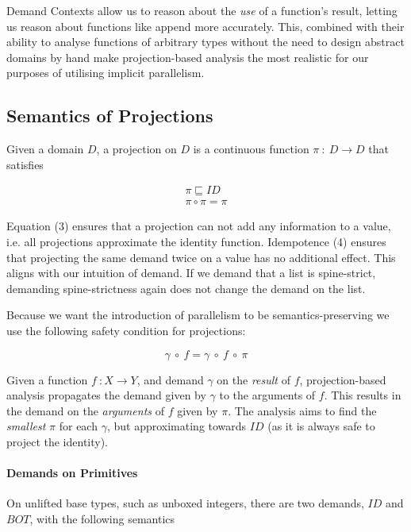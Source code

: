 Demand Contexts allow us to reason about the \emph{use} of a function's result,
letting us reason about functions like \<append\> more accurately. This, combined
with their ability to analyse functions of arbitrary types without the need to
design abstract domains by hand make projection-based analysis the most
realistic for our purposes of utilising implicit parallelism.

\pagebreak

\subsection{Semantics of Projections}
\label{sec:projSem}

Given a domain $D$, a projection on $D$ is a continuous function
$\pi \ : \ D \rightarrow D$ that satisfies

\begin{align}
\pi \sqsubseteq ID \\
\pi \circ \pi = \pi
\end{align}

Equation (3) ensures that a projection can not add any information to a value,
i.e. all projections approximate the identity function. Idempotence (4) ensures
that projecting the same demand twice on a value has no additional effect. This
aligns with our intuition of demand. If we demand that a list is spine-strict,
demanding spine-strictness again does not change the demand on the list.

Because we want the introduction of parallelism to be semantics-preserving we
use the following safety condition for projections:

\begin{equation}
\gamma \ \circ \ f = \gamma \ \circ \ f \ \circ \ \pi
\end{equation}

Given a function $f \ : X \rightarrow Y$, and demand $\gamma$ on the
\emph{result} of $f$, projection-based analysis propagates the demand given by
$\gamma$ to the arguments of $f$. This results in the demand on the
\emph{arguments} of $f$ given by $\pi$.  The analysis aims to find the
\emph{smallest} $\pi$ for each $\gamma$, but approximating towards $ID$ (as
it is always safe to project the identity).

\paragraph{Demands on Primitives}
On unlifted base types, such as unboxed integers, there are two demands,
$ID$ and $BOT$, with the following semantics


